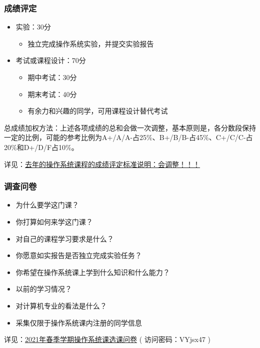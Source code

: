 \begin{frame}[fragile]
    \frametitle{成绩评定}
    \begin{itemize}
        \item 实验：30分
        \begin{itemize}
            \item 独立完成操作系统实验，并提交实验报告
        \end{itemize} %
        \item 考试或课程设计：70分
        \begin{itemize}
            \item 期中考试：30分
            \item 期末考试：40分
            \item 有余力和兴趣的同学，可用课程设计替代考试
        \end{itemize}

    \end{itemize} %

    总成绩加权方法：上述各项成绩的总和会做一次调整，基本原则是，各分数段保持一定的比例，可能的参考比例为A+/A/A-占25\%、B+/B/B-占45\%、C+/C/C-占20\%和D+/D/F占10\%。 
    \newline \newline
    
    详见：\href{http://os.cs.tsinghua.edu.cn/oscourse/OS2020spring/log#A20200210-.2BZM1PXHz7ft.2BL.2FnoLdoRiEH7pi8RbmmgHUcaL9GYO-}{去年的操作系统课程的成绩评定标准说明：会调整！！！}
    
\end{frame}

    
    \begin{frame}
        \frametitle{调查问卷}
        \begin{itemize}
            \item 为什么要学这门课？ %
            \item 你打算如何来学这门课？
            \item 对自己的课程学习要求是什么？
            \item 你愿意如实报告是否独立完成实验任务？
            \item 你希望在操作系统课上学到什么知识和什么能力？ %
            \item 以前的学习情况？
            \item 对计算机专业的看法是什么？ %
            \item 采集仅限于操作系统课内注册的同学信息
        \end{itemize}
        
    详见：\href{http://oscourse2019.mikecrm.com/2Z5XRdC}{2021年春季学期操作系统课选课问卷} ( 访问密码：VYjsx47 )
    
    \end{frame}


